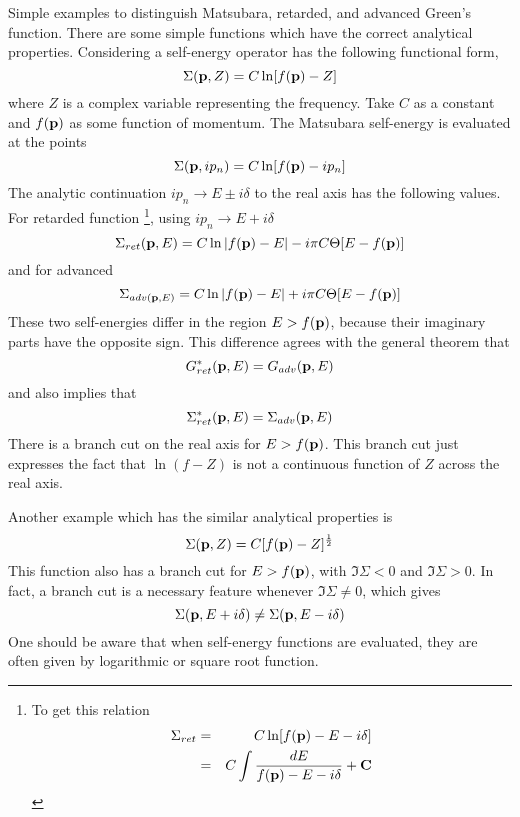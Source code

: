 Simple examples to distinguish Matsubara, retarded, and advanced Green's function.
There are some simple functions which have the correct analytical properties.
Considering a self-energy operator has the following functional form,
\begin{equation}
  \Sigma(\mathbf{p},Z) = C \ln [f(\mathbf{p}) -Z] \label{3.143}
\end{equation}
where $Z$ is a complex variable representing the frequency. Take $C$ as a constant and $f(\mathbf{p})$ as some function of momentum.
The Matsubara self-energy is evaluated at the points
\begin{equation}
  \Sigma(\mathbf{p},ip_n) = C \ln [f(\mathbf{p})-ip_n] \label{3.144}
\end{equation}
The analytic continuation $ip_n \to E  \pm i\delta$ to the real axis has the following values.
For retarded function \footnote{
To get this relation
\begin{eqnarray*}
    \Sigma_{ret} &=& C \ln [f(\mathbf{p})-E-i\delta]\\
    &=& C \int \frac{dE}{f(\mathbf{p})-E-i\delta} + \mathbf{C}
\end{eqnarray*}
}, using $ip_n \to E + i \delta$
\begin{equation}
  \Sigma_{ret}(\mathbf{p},E) = C \ln \abs{f(\mathbf{p}) -E} - i\pi C \Theta[E-f(\mathbf{p})] \label{3.145}
\end{equation}
and for advanced
\begin{equation}
  \Sigma_{adv(\mathbf{p},E)} = C \ln \abs{f(\mathbf{p})-E} + i\pi C \Theta[E-f(\mathbf{p})]  \label{3.146}
\end{equation}
These two self-energies differ in the region $E>f(\mathbf{p})$, because their imaginary parts have the opposite sign. This difference agrees with the general theorem that
\begin{equation}
  G^*_{ret}(\mathbf{p},E) = G_{adv}(\mathbf{p},E) \label{3.147}
\end{equation}
and also implies that
\begin{equation}
  \Sigma_{ret}^*(\mathbf{p},E) = \Sigma_{adv}(\mathbf{p},E) \label{3.148}
\end{equation}
There is a branch cut on the real axis for $E>f(\mathbf{p})$. This branch cut just expresses the fact that $\ln(f-Z)$ is not a continuous function of $Z$ across the real axis.

Another example which has the similar analytical properties is
\begin{equation}
  \Sigma(\mathbf{p},Z) = C[f(\mathbf{p}) -Z]^{\frac{1}{2}} \label{3.149}
\end{equation}
This function also has a branch cut for $E>f(\mathbf{p})$, with $\Im\Sigma<0$ and $\Im\Sigma>0$.
In fact, a branch cut is a necessary feature whenever $\Im \Sigma \neq 0$, which gives
\begin{equation}
  \Sigma(\mathbf{p},E+i\delta) \neq \Sigma(\mathbf{p},E-i\delta)  \label{3.150}
\end{equation}
One should be aware that when self-energy functions are evaluated, they are often given by logarithmic or square root function.

